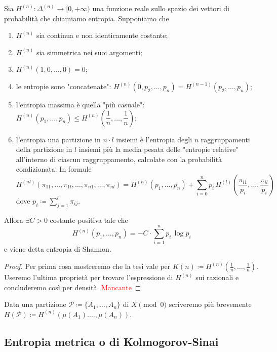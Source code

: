 \begin{thm}
    Sia $ H^{(n)} \colon \Delta^{(n)} \to [0, +\infty) $ una funzione reale sullo spazio dei vettori di probabilità che chiamiamo entropia. Supponiamo che
    \begin{enumerate}[label=(\roman*)]
        \item $ H^{(n)} $ sia continua e non identicamente costante;
        \item $ H^{(n)} $ sia simmetrica nei suoi argomenti;
        \item $ H^{(n)}(1, 0, \ldots, 0) = 0 $;
        \item le entropie sono "concatenate": $ H^{(n)}(0, p_2, \ldots, p_n) = H^{(n-1)}(p_2, \ldots, p_n) $;
        \item l'entropia massima è quella "più casuale": $ H^{(n)}(p_1, \ldots, p_n) \leq H^{(n)}\left(\dfrac{1}{n}, \ldots, \dfrac{1}{n}\right) $;
        \item l'entropia una partizione in $ n \cdot l $ insiemi è l'entropia degli $ n $ raggruppamenti della partizione in $ l $ insiemi più la media pesata delle "entropie relative" all'interno di ciascun raggruppamento, calcolate con la probabilità condizionata. In formule
        \[
            H^{(nl)}(\pi_{11}, \ldots, \pi_{1l}, \ldots, \pi_{n1}, \ldots, \pi_{nl}) = H^{(n)}(p_1, \ldots, p_n) + \sum_{i = 0}^{n} p_i \, H^{(l)} \left(\dfrac{\pi_{i1}}{p_i}, \ldots, \dfrac{\pi_{il}}{p_i}\right)
        \]
        dove $ p_i \coloneqq \sum_{j = 1}^{l} \pi_{ij} $.
    \end{enumerate}
    Allora $ \exists C > 0 $ costante positiva tale che
    \[
        H^{(n)}(p_1, \ldots, p_n) = -C \cdot \sum_{i = 1}^{n} p_i \, \log{p_i}
    \]
    e viene detta entropia di Shannon.
\end{thm}
\begin{proof}
    Per prima cosa mostreremo che la tesi vale per $ K(n) \coloneqq H^{(n)}\left(\frac{1}{n}, \ldots, \frac{1}{n}\right) $. Useremo l'ultima proprietà per trovare l'espressione di $ H^{(n)} $ sui razionali e concluderemo così per densità. \textcolor{red}{Mancante}
\end{proof}

Data una partizione $ \mathcal{P} \coloneqq \{A_1, \ldots, A_n\} $ di $ X \pmod{0} $ scriveremo più brevemente $ H(\mathcal{P}) \coloneqq H^{(n)}(\mu(A_1). \ldots, \mu(A_n)) $.

\subsection{Entropia metrica o di Kolmogorov-Sinai}

